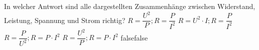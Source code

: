     {In welcher Antwort sind alle dargestellten Zusammenhänge zwischen Widerstand, Leistung, Spannung und Strom richtig?}
    {$R = \dfrac{U^2}{P};  R = \dfrac{P}{I^2}$}
    {$R = U^2\cdot I;  R = \dfrac{P}{I^2}$}
    {$R = \dfrac{P}{U^2};  R = P\cdot I^2$}
    {$R = \dfrac{U^2}{P};  R = P\cdot I^2$}
    {false}{false}